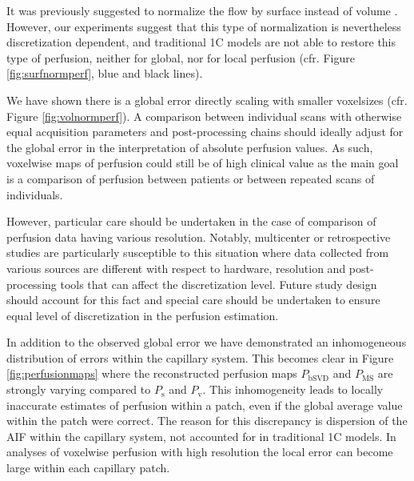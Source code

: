 \documentclass[final,5p,times,twocolumn]{elsarticle}
\begin{document}
It was previously suggested to normalize the flow by surface instead of volume \cite{Guibert2013}. However, our experiments suggest that this type of normalization is nevertheless discretization dependent, and traditional 1C models are not able to restore this type of perfusion, neither for global, nor for local perfusion (cfr. Figure \ref{fig:surfnormperf}, blue and black lines).

We have shown there is a global error directly scaling with smaller voxelsizes (cfr. Figure \ref{fig:volnormperf}). A comparison between individual scans with otherwise equal acquisition parameters and post-processing chains should ideally adjust for the global error in the interpretation of absolute perfusion values. As such, voxelwise maps of perfusion could still be of high clinical value as the main goal is a comparison of perfusion between patients or between repeated scans of individuals.%

However, particular care should be undertaken in the case of comparison of perfusion data having various resolution. Notably, multicenter or retrospective studies are particularly susceptible to this situation where data collected from various sources are different with respect to hardware, resolution and post-processing tools that can affect the discretization level. Future study design should account for this fact and special care should be undertaken to ensure equal level of discretization in the perfusion estimation. 

In addition to the observed global error we have demonstrated an inhomogeneous distribution of errors within the capillary system. This becomes clear in Figure \ref{fig:perfusionmaps} where the reconstructed perfusion maps $P_{\mathrm{bSVD}}$ and $P_{\mathrm{MS}}$ are strongly varying compared to $P_{\mathrm{s}}$ and $P_{\mathrm{v}}$. This inhomogeneity leads to locally inaccurate estimates of perfusion within a patch, even if the global average value within the patch were correct. The reason for this discrepancy is dispersion of the AIF within the capillary system, not accounted for in traditional 1C models. In analyses of voxelwise perfusion with high resolution the local error can become large within each capillary patch.
 
\end{document}
